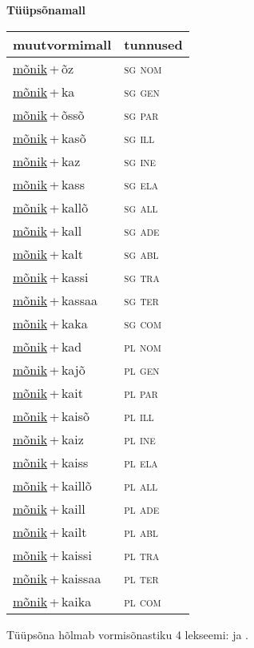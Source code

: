
\vspace{1.8em}
\begin{minipage}{\textwidth}
\textbf{Tüüpsõnamall \,}\\

\begin{sideways}
\begin{tabular}{l l}
muutvormimall & tunnused \\
\hline
\underline{mõnik}\,+\,õz & \textsc{ sg nom } \\
\underline{mõnik}\,+\,ka & \textsc{ sg gen } \\
\underline{mõnik}\,+\,õssõ & \textsc{ sg par } \\
\underline{mõnik}\,+\,kasõ & \textsc{ sg ill } \\
\underline{mõnik}\,+\,kaz & \textsc{ sg ine } \\
\underline{mõnik}\,+\,kass & \textsc{ sg ela } \\
\underline{mõnik}\,+\,kallõ & \textsc{ sg all } \\
\underline{mõnik}\,+\,kall & \textsc{ sg ade } \\
\underline{mõnik}\,+\,kalt & \textsc{ sg abl } \\
\underline{mõnik}\,+\,kassi & \textsc{ sg tra } \\
\underline{mõnik}\,+\,kassaa & \textsc{ sg ter } \\
\underline{mõnik}\,+\,kaka & \textsc{ sg com } \\
\underline{mõnik}\,+\,kad & \textsc{ pl nom } \\
\underline{mõnik}\,+\,kajõ & \textsc{ pl gen } \\
\underline{mõnik}\,+\,kait & \textsc{ pl par } \\
\underline{mõnik}\,+\,kaisõ & \textsc{ pl ill } \\
\underline{mõnik}\,+\,kaiz & \textsc{ pl ine } \\
\underline{mõnik}\,+\,kaiss & \textsc{ pl ela } \\
\underline{mõnik}\,+\,kaillõ & \textsc{ pl all } \\
\underline{mõnik}\,+\,kaill & \textsc{ pl ade } \\
\underline{mõnik}\,+\,kailt & \textsc{ pl abl } \\
\underline{mõnik}\,+\,kaissi & \textsc{ pl tra } \\
\underline{mõnik}\,+\,kaissaa & \textsc{ pl ter } \\
\underline{mõnik}\,+\,kaika & \textsc{ pl com } \\
\end{tabular}
\end{sideways}
\label{tab:tüüpsõnamall-mõnikõz}

\end{minipage}

 
\vspace{1em}
\noindent Tüüpsõna hõlmab vormisõnastiku 4 lekseemi:  ja .
